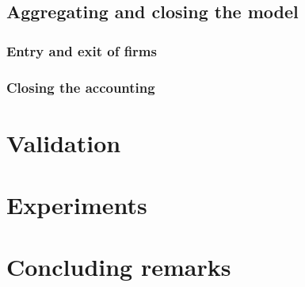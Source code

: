 \documentclass[12pt,openright,oneside,a4paper,english,sumario=tradicional]{gpsabntex}
\numberwithin{listing}{chapter}
\begin{document}
\subsection{Aggregating and closing the model}
\label{sec:orgb035547}

\subsubsection{Entry and exit of firms}
\label{sec:org32c967e}
\subsubsection{Closing the accounting}
\label{sec:org27b166e}


\section{Validation}
\label{sec:validation:ch_super}
\section{Experiments}
\label{sec:experiments:ch_super}
\section{Concluding remarks}
\label{sec:conclusion:ch_super}

\appendix
\end{document}

